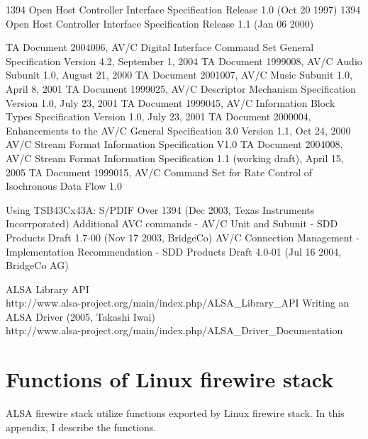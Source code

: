 \documentclass[onecolumn]{article}
\begin{document}
\begin{thebibliography}{99}
1394 Open Host Controller Interface Specification Release 1.0 (Oct 20 1997)
1394 Open Host Controller Interface Specification Release 1.1 (Jan 06 2000)

TA Document 2004006, AV/C Digital Interface Command Set General Specification Version 4.2, September 1, 2004
TA Document 1999008, AV/C Audio Subunit 1.0, August 21, 2000
TA Document 2001007, AV/C Music Subunit 1.0, April 8, 2001
TA Document 1999025, AV/C Descriptor Mechanism Specification Version 1.0, July 23, 2001
TA Document 1999045, AV/C Information Block Types Specification Version 1.0, July 23, 2001
TA Document 2000004, Enhancements to the AV/C General Specification 3.0 Version 1.1, Oct 24, 2000
AV/C Stream Format Information Specification V1.0
TA Document 2004008, AV/C Stream Format Information Specification 1.1 (working draft), April 15, 2005
TA Document 1999015, AV/C Command Set for Rate Control of Isochronous Data Flow 1.0

Using TSB43Cx43A: S/PDIF Over 1394 (Dec 2003, Texas Instruments Incorrporated)
Additional AVC commands - AV/C Unit and Subunit - SDD Products Draft 1.7-00 (Nov 17 2003, BridgeCo)
AV/C Connection Management - Implementation Recommendation - SDD Products Draft 4.0-01 (Jul 16 2004, BridgeCo AG)

ALSA Library API \\
http://www.alsa-project.org/main/index.php/ALSA\_Library\_API
Writing an ALSA Driver (2005, Takashi Iwai) \\
http://www.alsa-project.org/main/index.php/ALSA\_Driver\_Documentation

\end{thebibliography}

\newpage

\appendix

\section{Functions of Linux firewire stack}

ALSA firewire stack utilize functions exported by Linux firewire stack. In this appendix, I describe the functions.
\end{document}
